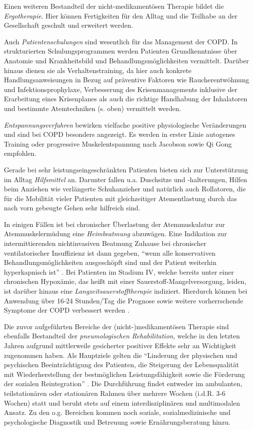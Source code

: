 Einen weiteren Bestandteil der nicht-medikamentösen Therapie bildet die \emph{Ergotherapie}. Hier können Fertigkeiten für den Alltag und die Teilhabe an der Gesellschaft geschult und erweitert werden.

Auch \emph{Patientenschulungen} sind wesentlich für das Management der COPD. 
In strukturierten Schulungsprogrammen werden Patienten Grundkenntnisse über Anatomie und Krankheitsbild und Behandlungsmöglichkeiten vermittelt. Darüber hinaus dienen sie als Verhaltenstraining, da hier auch konkrete Handlungsanweisungen in Bezug auf präventive Faktoren wie Raucherentwöhnung und Infektionsprophylaxe, Verbesserung des Krisenmanagements inklusive der Erarbeitung eines Krisenplanes als auch die richtige Handhabung der Inhalatoren und bestimmte Atemtechniken (s. oben) vermittelt werden.

\emph{Entspannungsverfahren} bewirken vielfache positive physiologische Veränderungen und sind bei COPD besonders angezeigt. Es werden in erster Linie autogenes Training oder progressive Muskelentspannung nach Jacobson sowie Qi Gong empfohlen.

Gerade bei sehr leistungseingeschränkten Patienten bieten sich zur Unterstützung im Alltag \emph{Hilfsmittel} an. Darunter fallen u.a. Duschsitze und -halterungen, Hilfen beim Anziehen wie verlängerte Schuhanzieher und natürlich auch Rollatoren, die für die Mobilität vieler Patienten mit gleichzeitiger Atementlastung durch das nach vorn gebeugte Gehen sehr hilfreich sind.

In einigen Fällen ist bei chronischer Überlastung der Atemmuskulatur zur Atemmuskelermüdung eine \emph{Heimbeatmung} abzuwägen. Eine Indikation zur intermittierenden nichtinvasiven Beatmung Zuhause bei chronischer ventilatorischer Insuffizienz ist dann gegeben, "`wenn alle konservativen Behandlungsmöglichkeiten ausgeschöpft sind und der Patient weiterhin hyperkapnisch ist"' \autocite[e22]{vogelmeier2007}. Bei Patienten im Stadium IV, welche bereits unter einer chronischen Hypoxämie, das heißt mit einer Sauerstoff-Mangelversorgung, leiden, ist darüber hinaus eine \emph{Langzeitsauerstofftherapie} indiziert. Hierdurch können bei Anwendung über 16-24 Stunden/Tag die Prognose sowie weitere vorherrschende Symptome der COPD verbessert werden \autocite[vgl.][e22]{vogelmeier2007}.

Die zuvor aufgeführten Bereiche der (nicht-)medikamentösen Therapie sind ebenfalls Bestandteil der \emph{pneumologischen Rehabilitation}, welche in den letzten Jahren aufgrund mittlerweile gesicherter positiver Effekte sehr an Wichtigkeit zugenommen haben. Als Hauptziele gelten die "`Linderung der physischen und psychischen Beeinträchtigung des Patienten, die Steigerung der Lebensqualität mit Wiederherstellung der bestmöglichen Leistungsfähigkeit sowie die Förderung der sozialen Reintegration"' \autocite[e21]{vogelmeier2007}. Die Durchführung findet entweder im ambulanten, teilstationären oder stationären Rahmen über mehrere Wochen (i.d.R. 3-6 Wochen) statt und beruht stets auf einem interdisziplinären und multimodalen Ansatz. Zu den o.g. Bereichen kommen noch soziale, sozialmedizinische und psychologische Diagnostik und Betreuung sowie Ernährungsberatung hinzu. 

